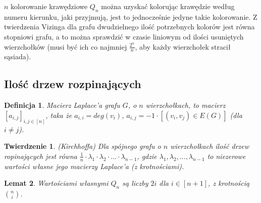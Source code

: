 \documentclass{pracamgr}
\newtheorem{defi}{Definicja}[section] %
\newtheorem{theorem}{Twierdzenie}
\newtheorem{lemma}[theorem]{Lemat}
\begin{document}
    $n$ kolorowanie krawędziowe $Q_n$ można uzyskać kolorując krawędzie według numeru kierunku, jaki przyjmują, jest to jednocześnie jedyne takie kolorowanie.
    Z twierdzenia Vizinga dla grafu dwudzielnego ilość potrzebnych kolorów jest równa stopniowi grafu, a to można sprawdzić w czasie liniowym od ilości
    usuniętych wierzchołków (musi być ich co najmniej $\frac{2^n}{n}$, aby każdy wierzchołek stracił sąsiada).
   \subsection{Ilość drzew rozpinających}
    \begin{defi}
     Macierz Laplace'a grafu $G$, o $n$ wierzchołkach, to macierz $[a_{i,j}]_{i,j\in[n]}$, taka że\newline
     $a_{i,i}=deg(v_i)$, $a_{i,j}=-1\cdot [(v_i,v_j)\in E(G)]$ (dla $i\neq j$).
    \end{defi}
    \begin{theorem}\label{Kirchhoff}
     (Kirchhoffa)\newline
     Dla spójnego grafu o $n$ wierzchołkach ilość drzew ropinających jest równa $\frac{1}{n}\cdot\lambda_1\cdot\lambda_2\cdot...\cdot\lambda_{n-1}$,
     gdzie $\lambda_1,\lambda_2,...,\lambda_{n-1}$ to niezerowe wartości własne jego macierzy Laplace'a (z krotnościami).
    \end{theorem}
    \begin{lemma}
     Wartościami własnymi $Q_n$ są liczby $2i$ dla $i\in[n+1]$, z krotnością ${n\choose i}$.
    \end{lemma}
\end{document}
